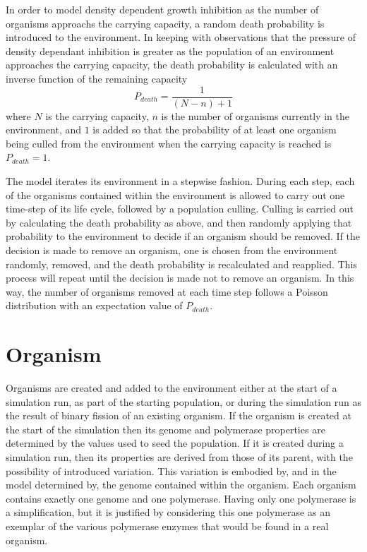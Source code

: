 In order to model density dependent growth inhibition as the number of organisms approachs the carrying capacity, a random death probability is introduced to the environment. In keeping with observations that the pressure of density dependant inhibition is greater as the population of an environment approaches the carrying capacity, the death probability is calculated with an inverse function of the remaining capacity\[
	P_{death} = \frac{1}{(N-n)+1}
\]where $N$ is the carrying capacity, $n$ is the number of organisms currently in the environment, and $1$ is added so that the probability of at least one organism being culled from the environment when the carrying capacity is reached is $P_{death}=1$.

The model iterates its environment in a stepwise fashion. During each step, each of the organisms contained within the environment is allowed to carry out one time-step of its life cycle, followed by a population culling. Culling is carried out by calculating the death probability as above, and then randomly applying that probability to the environment to decide if an organism should be removed. If the decision is made to remove an organism, one is chosen from the environment randomly, removed, and the death probability is recalculated and reapplied. This process will repeat until the decision is made not to remove an organism. In this way, the number of organisms removed at each time step follows a Poisson distribution with an expectation value of $P_{death}$.

\section*{Organism} %
\label{sec:organism}
Organisms are created and added to the environment either at the start of a simulation run, as part of the starting population, or during the simulation run as the result of binary fission of an existing organism. If the organism is created at the start of the simulation then its genome and polymerase properties are determined by the values used to seed the population. If it is created during a simulation run, then its properties are derived from those of its parent, with the possibility of introduced variation. This variation is embodied by, and in the model determined by, the genome contained within the organism. Each organism contains exactly one genome and one polymerase. Having only one polymerase is a simplification, but it is justified by considering this one polymerase as an exemplar of the various polymerase enzymes that would be found in a real organism.

